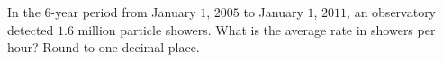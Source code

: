 In the $6$-year period from January $1$, $2005$ to January $1$, $2011$, an observatory detected $1.6$ million particle showers. What is the average rate in showers per hour? Round to one decimal place.
